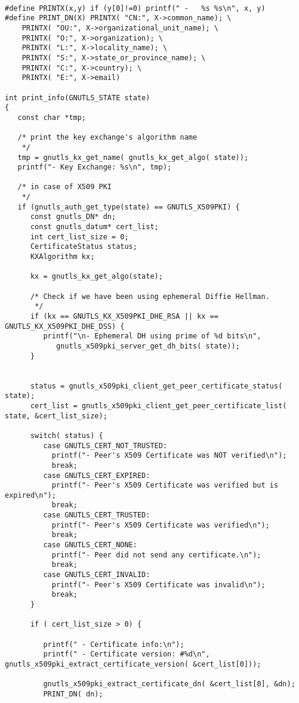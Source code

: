 \begin{verbatim}

#define PRINTX(x,y) if (y[0]!=0) printf(" -   %s %s\n", x, y)
#define PRINT_DN(X) PRINTX( "CN:", X->common_name); \
	PRINTX( "OU:", X->organizational_unit_name); \
	PRINTX( "O:", X->organization); \
	PRINTX( "L:", X->locality_name); \
	PRINTX( "S:", X->state_or_province_name); \
	PRINTX( "C:", X->country); \
	PRINTX( "E:", X->email)

int print_info(GNUTLS_STATE state)
{
   const char *tmp;

   /* print the key exchange's algorithm name
    */
   tmp = gnutls_kx_get_name( gnutls_kx_get_algo( state));
   printf("- Key Exchange: %s\n", tmp);

   /* in case of X509 PKI
    */
   if (gnutls_auth_get_type(state) == GNUTLS_X509PKI) {
      const gnutls_DN* dn;
      const gnutls_datum* cert_list;
      int cert_list_size = 0;
      CertificateStatus status;
      KXAlgorithm kx;

      kx = gnutls_kx_get_algo(state);

      /* Check if we have been using ephemeral Diffie Hellman.
       */
      if (kx == GNUTLS_KX_X509PKI_DHE_RSA || kx == GNUTLS_KX_X509PKI_DHE_DSS) {
         printf("\n- Ephemeral DH using prime of %d bits\n",
            gnutls_x509pki_server_get_dh_bits( state));
      }


      status = gnutls_x509pki_client_get_peer_certificate_status( state);
      cert_list = gnutls_x509pki_client_get_peer_certificate_list( state, &cert_list_size);

      switch( status) {
         case GNUTLS_CERT_NOT_TRUSTED:
           printf("- Peer's X509 Certificate was NOT verified\n");
           break;
         case GNUTLS_CERT_EXPIRED:
           printf("- Peer's X509 Certificate was verified but is expired\n");
           break;
         case GNUTLS_CERT_TRUSTED:
           printf("- Peer's X509 Certificate was verified\n");
           break;
         case GNUTLS_CERT_NONE:
           printf("- Peer did not send any certificate.\n");
           break;
         case GNUTLS_CERT_INVALID:
           printf("- Peer's X509 Certificate was invalid\n");
           break;
      }
		
      if ( cert_list_size > 0) {

         printf(" - Certificate info:\n");
         printf(" - Certificate version: #%d\n", gnutls_x509pki_extract_certificate_version( &cert_list[0]));

         gnutls_x509pki_extract_certificate_dn( &cert_list[0], &dn);
         PRINT_DN( dn);


\end{verbatim}
